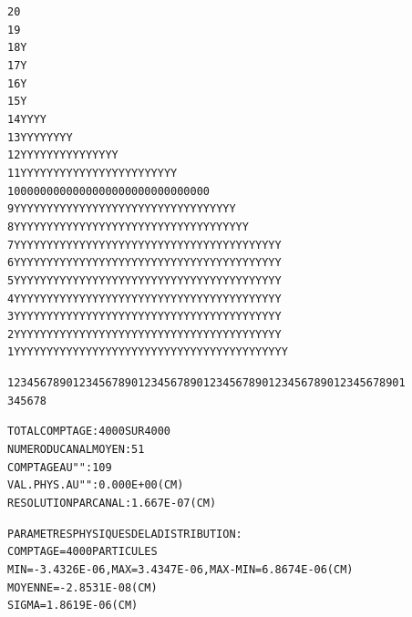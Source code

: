 \begin{tiny}
\begin{center}
\begin{alltt}
   20                                                                                      
   19                                                                                      
   18                                                    Y                                 
   17                                                    Y                                 
   16                                                    Y                                 
   15                                                    Y                                 
   14                                                  YYY     Y                           
   13                                               Y  YYY    YY YY                        
   12                                               YYYYYY YYYYYYYY             Y          
   11                                   Y  Y      Y YYYYYYYYYYYYYYYYY  YY    Y  Y          
   10                                   0  0   00000000000000000000000 00    0  0          
    9                                   Y YYYY YYYYYYYYYYYYYYYYYYYYYYYYYY    Y YY          
    8                                   Y YYYY YYYYYYYYYYYYYYYYYYYYYYYYYYYY  Y YY          
    7                                   YYYYYYYYYYYYYYYYYYYYYYYYYYYYYYYYYYYYYYYYY          
    6                                   YYYYYYYYYYYYYYYYYYYYYYYYYYYYYYYYYYYYYYYYY          
    5                                   YYYYYYYYYYYYYYYYYYYYYYYYYYYYYYYYYYYYYYYYY          
    4                                   YYYYYYYYYYYYYYYYYYYYYYYYYYYYYYYYYYYYYYYYY          
    3                                   YYYYYYYYYYYYYYYYYYYYYYYYYYYYYYYYYYYYYYYYY          
    2                                   YYYYYYYYYYYYYYYYYYYYYYYYYYYYYYYYYYYYYYYYY          
    1                                  YYYYYYYYYYYYYYYYYYYYYYYYYYYYYYYYYYYYYYYYYY          

                              1234567890123456789012345678901234567890123456789012345678901
                                       3         4         5         6         7         8

                TOTAL  COMPTAGE                 :    4000  SUR   4000
                NUMERO   DU  CANAL  MOYEN       :      51
                COMPTAGE  AU   "      "         :     109
                VAL. PHYS. AU  "      "         :  0.000E+00 (CM) 
                RESOLUTION  PAR  CANAL          :  1.667E-07 (CM) 

                PARAMETRES  PHYSIQUES  DE  LA  DISTRIBUTION :
                              COMPTAGE =   4000  PARTICULES
                              MIN = -3.4326E-06, MAX =  3.4347E-06, MAX-MIN =  6.8674E-06 (CM) 
                              MOYENNE = -2.8531E-08 (CM) 
                              SIGMA =  1.8619E-06 (CM) 


\end{alltt}
\end{center}
\end{tiny}
